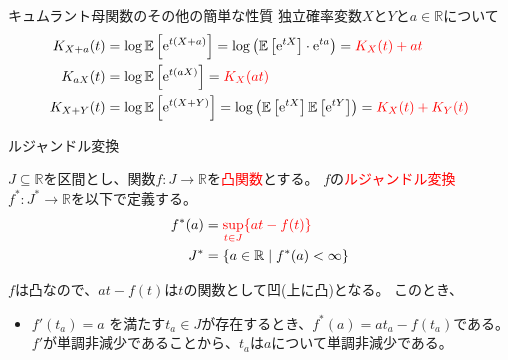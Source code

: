 \documentclass[lualatex,handout]{beamer}
\newcommand{\emm}[1]{\textcolor{red}{#1}}
\newcommand{\expt}[1]{\mathbb{E}\left[#1\right]}
\theoremstyle{definition}
\begin{document}
\begin{frame}{キュムラント母関数のその他の簡単な性質}
独立確率変数$X$と$Y$と$a\in\mathbb{R}$について
\begin{align*}
K_{X+a}(t) &= \log\expt{\mathrm{e}^{t(X+a)}} = \log\left(\expt{\mathrm{e}^{tX}}\cdot \mathrm{e}^{ta}\right) = \emm{K_X(t) + at}\\
K_{aX}(t) &= \log\expt{\mathrm{e}^{t(aX)}} = \emm{K_X(at)}\\
K_{X+Y}(t) &= \log\expt{\mathrm{e}^{t(X+Y)}} =\log\left(\expt{\mathrm{e}^{tX}}\expt{\mathrm{e}^{tY}}\right) = \emm{K_X(t) + K_Y(t)}
\end{align*}
\end{frame}

\begin{frame}{ルジャンドル変換}
\begin{definition}
$J\subseteq\mathbb{R}$を区間とし、関数$f\colon J\to\mathbb{R}$を\emm{凸関数}とする。
$f$の\emm{ルジャンドル変換}$f^*\colon J^*\to\mathbb{R}$を以下で定義する。
\begin{align*}
f^*(a) &= \emm{\sup_{t\in J}\{at - f(t)\}}\\
J^*&=\{a\in\mathbb{R}\mid f^*(a)<\infty\}
\end{align*}
\end{definition}

\vspace{1em}
$f$は凸なので、$at-f(t)$は$t$の関数として凹(上に凸)となる。
このとき、
\begin{itemize}
\setlength{\itemsep}{1em}
\item $f'(t_a) = a$ を満たす$t_a\in J$が存在するとき、$f^*(a) = at_a - f(t_a)$である。
$f'$が単調非減少であることから、$t_a$は$a$について単調非減少である。
\end{itemize}
\end{frame}
\end{document}
